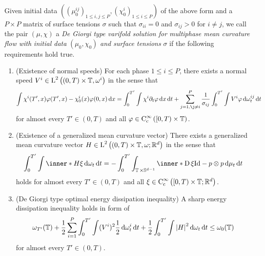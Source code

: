 \begin{definition}
	Given initial data 
	$ (
		( \mu_{ 0 }^{ i j } )_{ 1 \leq i , j \leq P },
		( \chi^{ i}_{ 0 } )_{ 1 \leq i \leq P}
	) $
	of the above form and a $ P \times P $ matrix of surface tensions $ \sigma 
	$ such that $ \sigma_{ i i }=0 $ and $ \sigma_{ i j } > 0 $ for $ i \neq j 
	$, we call the pair $ \left( \mu , \chi \right) $ a
	\emph{De Giorgi type varifold solution for multiphase mean curvature flow 
	with initial data} $ ( \mu_{ 0 } , \chi_{ 0 } ) $ \emph{and surface 
	tensions} $ \sigma $ if the following requirements hold true.
	\begin{enumerate}
		\item (Existence of normal speeds)
		For each phase $ 1 \leq i \leq P $, there exists a normal speed
		$ V^{ i } \in \operatorname{L}^{ 2 } \left(
			( 0 , T ) \times \operatorname{\mathbb{T}}, \omega^{ i } \right) $ in the sense 
			that
		\begin{equation}
			\label{equation_varifold_velocity_multiphase}
			\int
				\chi^{ i } ( T', x ) \varphi ( T', x ) 
				-
				\chi^{ i }_{ 0 } ( x ) \varphi ( 0 , x )
			\dd{ x }
			=
			\int_{ 0 }^{ T' }
				\int
					\chi^{ i }
					\partial_{ t } \varphi
				\dd{ x }
			\dd{ t }
			+
			\sum_{ j =1, \j \neq i  }^{ P }
				\frac{ 1 }{ \sigma_{ i j } }
				\int_{ 0 }^{ T' }
					\int
						V^{ i }
						\varphi
					\dd{ \omega_{ t }^{ i j } }
				\dd{ t }
		\end{equation}
		for almost every $ T' \in ( 0 , T ) $ and all $ \varphi \in \operatorname{C}_{ 
		\mathrm{c} }^{ \infty } \left( [ 0 , T ) \times \operatorname{\mathbb{T}}\right) 
		$.
		
	\item (Existence of a generalized mean curvature vector)
	There exists a generalized mean curvature vector 
	$ H \in \operatorname{L}^{ 2 } \left(
		( 0 , T )\times \operatorname{\mathbb{T}} , \omega; \mathbb{ R }^{ d } \right)
	 $
	in the sense that
	\begin{equation}
		\label{equation_varifold_mean_curvature_multiphase}
		\int_{ 0 }^{ T' }
			\int
				\inner*{ H }{ \xi }
			\dd{ \omega_{ t } }
		\dd{ t }
		=
		-
		\int_{ 0 }^{ T' }
			\int_{ \flattorus \times \mathbb{ S }^{ d - 1 } }
				\inner*{ \diff \xi }
				{ \mathrm{Id} - p \otimes p }
			\dd{ \mu_{ t } }
		\dd{ t }
	\end{equation}
	holds for almost every $ T' \in ( 0 , T ) $ and all $ \xi \in \operatorname{C}_{ 
	\mathrm{c} }^{ \infty } \left( [ 0 , T ) \times \operatorname{\mathbb{T}} ; \mathbb{ 
	R }^{ d } \right) $.
	
	\item (De Giorgi type optimal energy dissipation inequality)
	A sharp energy dissipation inequality holds in form of
	\begin{equation}
		\label{equation_varifold_energy_dissipation_inequality}
		\omega_{ T' } ( \operatorname{\mathbb{T}} )
		+
		\frac{ 1 }{ 2 }
		\sum_{ i = 1 }^{ P }
			\int_{ 0 }^{ T' }
				\int
					( V^{ i } )^{ 2 }
					\frac{ 1 }{ 2 }
				\dd{ \omega_{ t }^{ i } }
			\dd{ t }
		+
		\frac{ 1 }{ 2 }
		\int_{ 0 }^{ T' }
			\int
				\abs{ H }^{ 2 }
			\dd{ \omega_{ t } }
		\dd{ t }
		\leq
		\omega_{ 0 } ( \operatorname{\mathbb{T}} )
	\end{equation}
	for almost every $ T' \in ( 0 , T ) $.
	

\end{enumerate}
\end{definition}
